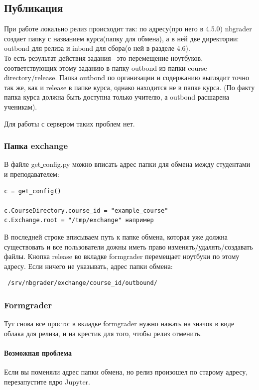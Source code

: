 \documentclass[a4paper,12pt]{article}
\begin{document}
\subsection{Публикация}

При работе локально релиз происходит так: по адресу(про него в 4.5.0) nbgrader создает папку с названием курса(папку для обмена), а в ней две директории: outbond для релиза и inbond для сбора(о ней в разделе 4.6). \\То есть результат действия  задания\grqq -- это перемещение ноутбуков, соответствующих этому заданию в папку outbond из папки course\underline{ }directory/release.
Папка outbond по организации и содержанию выглядит точно так же, как и release в папке курса, однако находится не в папке курса. (По факту папка курса должна быть доступна только учителю, а outbond расшарена ученикам).

Для работы с сервером таких проблем нет.
\subsubsection{Папка exchange}
В файле get\underline{ }config.py можно вписать адрес папки для обмена между студентами и преподавателем:
\begin{verbatim}
c = get_config()

c.CourseDirectory.course_id = "example_course"
c.Exchange.root = "/tmp/exchange" например
\end{verbatim}
В последней строке вписываем путь к папке обмена, которая уже должна существовать и все пользователи дожны иметь право изменять/удалять/создавать файлы.
Кнопка release во вкладке formgrader перемещает ноутбуки по этому адресу. Если ничего не указывать, адрес папки обмена:
\begin{verbatim} /srv/nbgrader/exchange/course_id/outbound/ \end{verbatim}
\subsubsection{Formgrader}

Тут снова все просто: в вкладке formgrader нужно нажать на значок в виде облака для релиза, и на крестик для того, чтобы релиз отменить. 
\paragraph{Возможная проблема}
Если вы поменяли адрес папки обмена, но релиз произошел по старому адресу, перезапустите ядро Jupyter.
\end{document}
